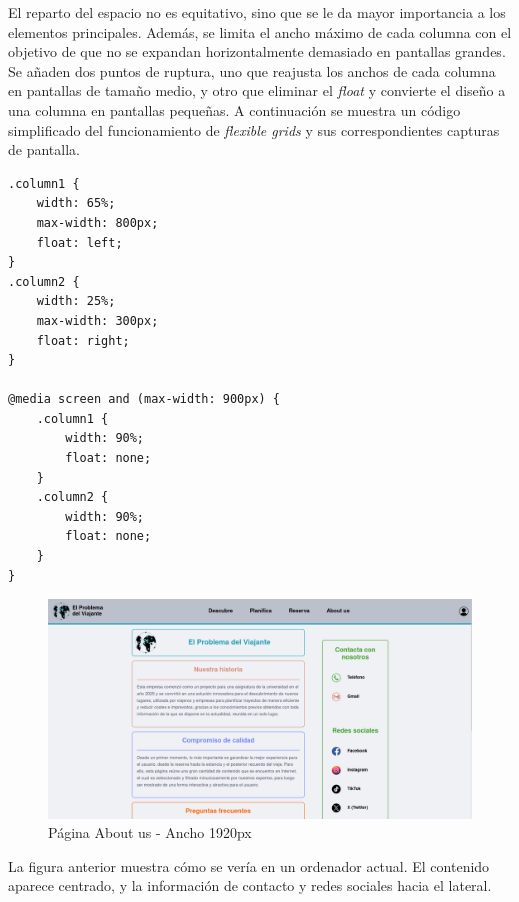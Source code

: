 \documentclass[11pt, a4paper]{book}
\begin{document}
	El reparto del espacio no es equitativo, sino que se le da mayor importancia a los elementos principales. Además, se limita el ancho máximo de cada columna con el objetivo de que no se expandan horizontalmente demasiado en pantallas grandes. Se añaden dos puntos de ruptura, uno que reajusta los anchos de cada columna en pantallas de tamaño medio, y otro que eliminar el \textit{float} y convierte el diseño a una columna en pantallas pequeñas. A continuación se muestra un código simplificado del funcionamiento de \textit{flexible grids} y sus correspondientes capturas de pantalla.
	
	\begin{lstlisting}[]
.column1 {
	width: 65%;
	max-width: 800px;
	float: left;
}
.column2 {
	width: 25%;
	max-width: 300px;
	float: right;
}

@media screen and (max-width: 900px) {
	.column1 {
		width: 90%;
		float: none;
	}
	.column2 {
		width: 90%;
		float: none;
	}
}
	\end{lstlisting}

	\begin{figure} [H]
		\centering
		\includegraphics[width=\textwidth]{CSS/3-1 1920.png}
		\caption{Página About us - Ancho 1920px}
	\end{figure}

	La figura anterior muestra cómo se vería en un ordenador actual. El contenido aparece centrado, y la información de contacto y redes sociales hacia el lateral.
	
\end{document}
